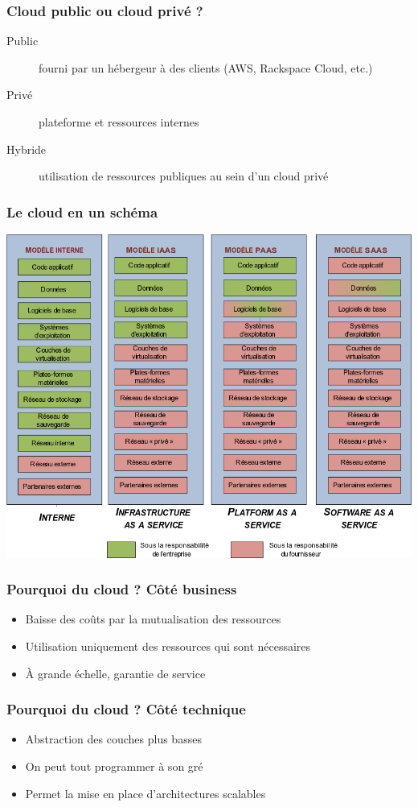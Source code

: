   \begin{frame}
    \frametitle{Cloud public ou cloud privé ?}
    \begin{description}
      \item[Public] fourni par un hébergeur à des clients (AWS, Rackspace Cloud, etc.)
      \item[Privé] plateforme et ressources internes
      \item[Hybride] utilisation de ressources publiques au sein d'un cloud privé
    \end{description}
  \end{frame}

  \begin{frame}
    \frametitle{Le cloud en un schéma}
    \includegraphics[width=\linewidth,height=\textheight]{images/cloud.png}
  \end{frame}

  \begin{frame}
    \frametitle{Pourquoi du cloud ? Côté business}
    \begin{itemize}
      \item Baisse des coûts par la mutualisation des ressources
      \item Utilisation uniquement des ressources qui sont nécessaires
      \item À grande échelle, garantie de service
    \end{itemize}
  \end{frame}

  \begin{frame}
    \frametitle{Pourquoi du cloud ? Côté technique}
    \begin{itemize}
      \item Abstraction des couches plus basses
      \item On peut tout programmer à son gré
      \item Permet la mise en place d'architectures scalables
    \end{itemize}
  \end{frame}

